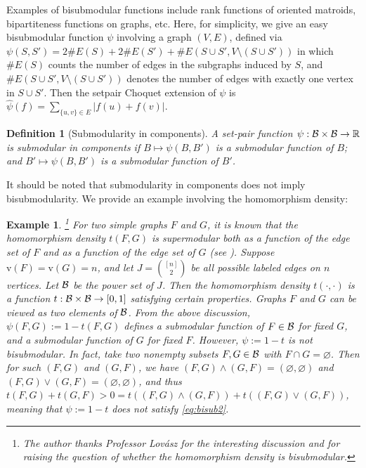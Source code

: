 \documentclass[12pt,a4paper]{article}
\newtheorem{example}[theorem]{Example}
\newtheorem{defn}[theorem]{Definition}
\begin{document}
Examples of bisubmodular functions include rank functions of  oriented matroids, bipartiteness functions on graphs, etc. 
Here, for simplicity, we give an easy bisubmodular function $\psi$ involving a graph $(V,E)$, defined via $\psi(S,S')=2\#E(S)+2\#E(S')+\#E(S\cup S',V\setminus(S\cup S'))$ in which $\#E(S)$ counts the number of edges in the subgraphs induced by $S$, and $\#E(S\cup S',V\setminus(S\cup S'))$ denotes the number of edges with exactly one vertex in $S\cup S'$. Then the setpair Choquet extension of $\psi$ is $\widehat{\psi}(f)=\sum_{\{u,v\}\in E}|f(u)+f(v)|$. 

\begin{defn}[Submodularity in components]
A set-pair function $\psi:\mathcal{B}\times\mathcal{B}\to\mathbb{R}$ is \emph{submodular in components} if %
$B\mapsto \psi(B,B')$ is a  submodular function of $B$; and %
$B'\mapsto \psi(B,B')$ is a  submodular function of $B'$. 
\end{defn}
It should be noted that submodularity in components does not imply bisubmodularity. %
We provide an example involving the homomorphism density:

\begin{example}\footnote{The author thanks Professor Lov\'asz for the interesting discussion and for raising the question of whether the homomorphism density is bisubmodular.}
For two simple graphs $F$ and $G$, it is known that the homomorphism density $t(F,G)$ is supermodular both as a function of the edge set of $F$ and as a function of the edge set of $G$ (see \cite{BCLSV06}). Suppose $\mathrm{v}(F)=\mathrm{v}(G)=n$, and let  $J={[n]\choose 2}%
$ be all possible labeled edges on $n$ vertices. Let $\mathcal{B}$ be the power set of $J$. Then the homomorphism density $t(\cdot,\cdot)$ is %
a function $t:\mathcal{B}\times \mathcal{B}\to [0,1]$ satisfying certain properties. 
Graphs $F$ and $G$ can be viewed as two elements of $\mathcal{B}$. 
From the above discussion, $\psi(F,G):=1-t(F,G)$ defines a submodular function of $F\in\mathcal{B}$ for fixed $G$, and a submodular function of $G$ for fixed $F$. 
However, $\psi:=1-t$ is not bisubmodular. In fact, take two nonempty subsets $F,G\in\mathcal{B}$ with $F\cap G=\varnothing$.  %
Then for such $(F,G)$ and $(G,F)$, we have $(F,G)\wedge(G,F)=(\varnothing,\varnothing)$ and $(F,G)\vee(G,F)=(\varnothing,\varnothing)$, and thus  $t(F,G)+t(G,F)>0=t((F,G)\wedge(G,F))+t((F,G)\vee(G,F))$, meaning that $\psi:=1-t$ does not satisfy \eqref{eq:bisub2}.

\end{example}
\end{document}
